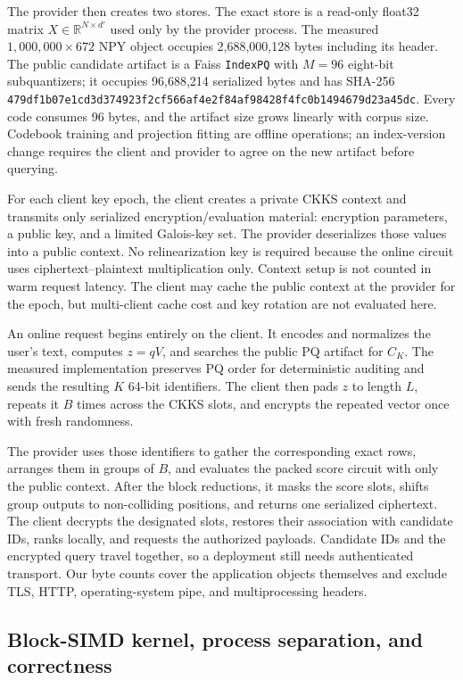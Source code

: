 \documentclass[pdflatex,sn-basic,Numbered]{sn-jnl}
\newcommand{\R}{\mathbb{R}}
\theoremstyle{plain}
\begin{document}
The provider then creates two stores. The exact store is a read-only float32 matrix $X\in\R^{N\times d'}$ used only by the provider process. The measured $1{,}000{,}000\times672$ NPY object occupies 2,688,000,128 bytes including its header. The public candidate artifact is a Faiss \texttt{IndexPQ} with $M=96$ eight-bit subquantizers; it occupies 96,688,214 serialized bytes and has SHA-256 \texttt{479df1b07e1cd3d374923f2cf566af4e2f84af98428f4fc0b1494679d23a45dc}. Every code consumes 96 bytes, and the artifact size grows linearly with corpus size. Codebook training and projection fitting are offline operations; an index-version change requires the client and provider to agree on the new artifact before querying.

For each client key epoch, the client creates a private CKKS context and transmits only serialized encryption/evaluation material: encryption parameters, a public key, and a limited Galois-key set. The provider deserializes those values into a public context. No relinearization key is required because the online circuit uses ciphertext--plaintext multiplication only. Context setup is not counted in warm request latency. The client may cache the public context at the provider for the epoch, but multi-client cache cost and key rotation are not evaluated here.

An online request begins entirely on the client. It encodes and normalizes the user's text, computes $z=qV$, and searches the public PQ artifact for $C_K$. The measured implementation preserves PQ order for deterministic auditing and sends the resulting $K$ 64-bit identifiers. The client then pads $z$ to length $L$, repeats it $B$ times across the CKKS slots, and encrypts the repeated vector once with fresh randomness.

The provider uses those identifiers to gather the corresponding exact rows, arranges them in groups of $B$, and evaluates the packed score circuit with only the public context. After the block reductions, it masks the score slots, shifts group outputs to non-colliding positions, and returns one serialized ciphertext. The client decrypts the designated slots, restores their association with candidate IDs, ranks locally, and requests the authorized payloads. Candidate IDs and the encrypted query travel together, so a deployment still needs authenticated transport. Our byte counts cover the application objects themselves and exclude TLS, HTTP, operating-system pipe, and multiprocessing headers.

\subsection{Block-SIMD kernel, process separation, and correctness}\label{subsec:kernel}
\end{document}
